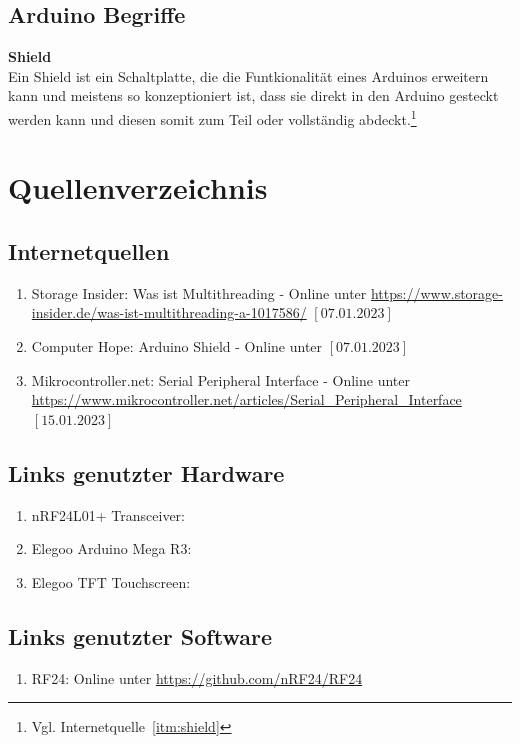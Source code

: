 \documentclass[a4paper, 11pt]{scrartcl}
\begin{document}
\subsection{Arduino Begriffe}
\textbf{Shield\label{def:shield}}
\\
Ein Shield ist ein Schaltplatte, die die Funtkionalität eines Arduinos erweitern kann und meistens so konzeptioniert ist, dass sie direkt in den Arduino gesteckt werden kann und diesen somit
zum Teil oder vollständig abdeckt.\footnote{Vgl. Internetquelle~\ref{itm:shield}}
\newpage
\section{Quellenverzeichnis}
\subsection{Internetquellen}
\begin{enumerate}
    \item Storage Insider: Was ist Multithreading - Online unter \url{https://www.storage-insider.de/was-ist-multithreading-a-1017586/} $\left[\text{07.01.2023}\right]$ \label{itm:multithread}
    \item Computer Hope: Arduino Shield - Online unter \url{} $\left[\text{07.01.2023}\right]$ \label{itm:shield}
    \item Mikrocontroller.net: Serial Peripheral Interface - Online unter \url{https://www.mikrocontroller.net/articles/Serial_Peripheral_Interface} $\left[\text{15.01.2023}\right]$ \label{itm:SPI}
\end{enumerate}

\subsection{Links genutzter Hardware}\label{ch:hardwarelinks}
\begin{enumerate}
    \item nRF24L01+ Transceiver: \url{}\label{itm:transceiverlink}
    \item Elegoo Arduino Mega R3: \url{}\label{itm:arduinolink}
    \item Elegoo TFT Touchscreen: \url{}\label{itm:tftlink}
\end{enumerate}

\subsection{Links genutzter Software}\label{ch:softwarelinks}
\begin{enumerate}
    \item RF24: Online unter \url{https://github.com/nRF24/RF24}\label{link:rf24}
\end{enumerate}
\end{document}
